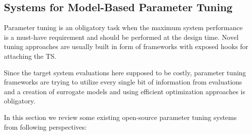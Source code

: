 \subsection{Systems for Model-Based Parameter Tuning}\label{bg: parameter tuning expamples}
Parameter tuning is an obligatory task when the maximum system performance is a must-have requirement and should be performed at the design time.
Novel tuning approaches are usually built in form of frameworks with exposed hooks for attaching the TS.

Since the target system evaluations here supposed to be costly, parameter tuning frameworks are trying to utilize every single bit of information from evaluations and a creation of surrogate models and using efficient optimization approaches is obligatory.

In this section we review some existing open-source parameter tuning systems from following perspectives:
